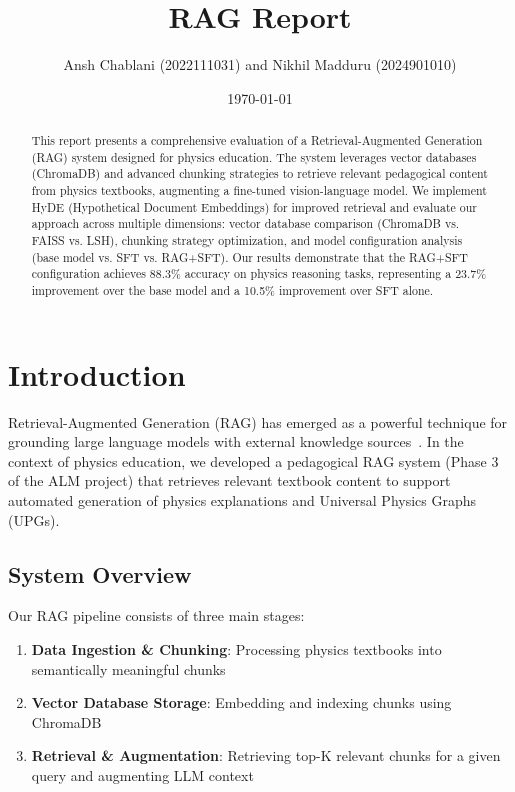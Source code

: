 \documentclass[11pt,a4paper]{article}
\title{RAG Report}
\author{Ansh Chablani (2022111031) and Nikhil Madduru (2024901010)}
\date{\today}
\begin{document}
\maketitle

\begin{abstract}
This report presents a comprehensive evaluation of a Retrieval-Augmented Generation (RAG) system designed for physics education. The system leverages vector databases (ChromaDB) and advanced chunking strategies to retrieve relevant pedagogical content from physics textbooks, augmenting a fine-tuned vision-language model. We implement HyDE (Hypothetical Document Embeddings) for improved retrieval and evaluate our approach across multiple dimensions: vector database comparison (ChromaDB vs. FAISS vs. LSH), chunking strategy optimization, and model configuration analysis (base model vs. SFT vs. RAG+SFT). Our results demonstrate that the RAG+SFT configuration achieves 88.3\% accuracy on physics reasoning tasks, representing a 23.7\% improvement over the base model and a 10.5\% improvement over SFT alone.
\end{abstract}

\section{Introduction}

Retrieval-Augmented Generation (RAG) has emerged as a powerful technique for grounding large language models with external knowledge sources~\cite{lewis2020retrieval,gao2023retrievalaugmented}. In the context of physics education, we developed a pedagogical RAG system (Phase 3 of the ALM project) that retrieves relevant textbook content to support automated generation of physics explanations and Universal Physics Graphs (UPGs).

\subsection{System Overview}

Our RAG pipeline consists of three main stages:
\begin{enumerate}
    \item \textbf{Data Ingestion \& Chunking}: Processing physics textbooks into semantically meaningful chunks
    \item \textbf{Vector Database Storage}: Embedding and indexing chunks using ChromaDB
    \item \textbf{Retrieval \& Augmentation}: Retrieving top-K relevant chunks for a given query and augmenting LLM context
\end{enumerate}
\end{document}
